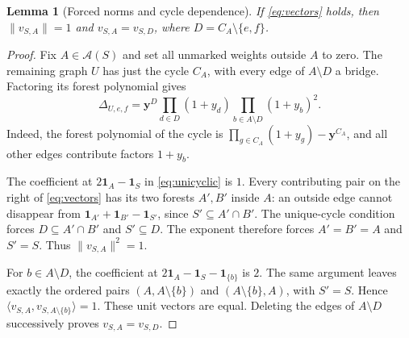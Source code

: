 \documentclass[11pt,a4paper]{article}
\newtheorem{lemma}[theorem]{Lemma}
\newcommand{\Asets}{\mathcal A}
\newcommand{\ind}{\mathbf 1}
\begin{document}
\begin{lemma}[Forced norms and cycle dependence]\label{lem:forced}
If \eqref{eq:vectors} holds, then $\|v_{S,A}\|=1$ and
$v_{S,A}=v_{S,D}$, where $D=C_A\setminus\{e,f\}$.
\end{lemma}
\begin{proof}
Fix $A\in\Asets(S)$ and set all unmarked weights outside $A$ to
zero. The remaining graph $U$ has just the cycle $C_A$, with every
edge of $A\setminus D$ a bridge. Factoring its forest polynomial gives
\begin{equation}\label{eq:unicyclic}
 \Delta_{U,e,f}=\boldsymbol y^D\prod_{d\in D}(1+y_d)
                    \prod_{b\in A\setminus D}(1+y_b)^2.
\end{equation}
Indeed, the forest polynomial of the cycle is
$\prod_{g\in C_A}(1+y_g)-\boldsymbol y^{C_A}$, and all other
edges contribute factors $1+y_b$.

The coefficient at $2\ind_A-\ind_S$ in \eqref{eq:unicyclic}
is $1$. Every contributing pair on the right of \eqref{eq:vectors}
has its two forests $A',B'$ inside $A$: an outside edge cannot
disappear from $\ind_{A'}+\ind_{B'}-\ind_{S'}$, since
$S'\subseteq A'\cap B'$. The unique-cycle condition forces
$D\subseteq A'\cap B'$ and $S'\subseteq D$. The exponent
therefore forces $A'=B'=A$ and $S'=S$. Thus $\|v_{S,A}\|^2=1$.

For $b\in A\setminus D$, the coefficient at
$2\ind_A-\ind_S-\ind_{\{b\}}$ is $2$. The same argument leaves
exactly the ordered pairs $(A,A\setminus\{b\})$ and
$(A\setminus\{b\},A)$, with $S'=S$. Hence
$\langle v_{S,A},v_{S,A\setminus\{b\}}\rangle=1$.
These unit vectors are equal. Deleting the edges of $A\setminus D$
successively proves $v_{S,A}=v_{S,D}$.
\end{proof}
\end{document}
